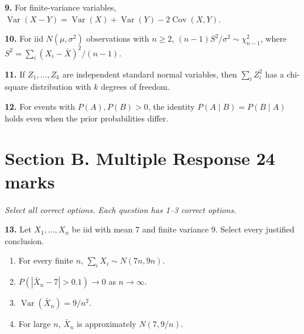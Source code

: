 \documentclass[11pt,a4paper]{article}
\begin{document}
\par\noindent\begin{minipage}{\linewidth}
\textbf{9.} For finite-variance variables, \(\operatorname{Var}(X-Y)=\operatorname{Var}(X)+\operatorname{Var}(Y)-2\operatorname{Cov}(X,Y)\).
\end{minipage}\par\vspace{3mm}
\par\noindent\begin{minipage}{\linewidth}
\textbf{10.} For iid \(N(\mu,\sigma^2)\) observations with \(n\ge2\), \((n-1)S^2/\sigma^2\sim\chi^2_{n-1}\), where \(S^2=\sum_i(X_i-\bar X)^2/(n-1)\).
\end{minipage}\par\vspace{3mm}
\par\noindent\begin{minipage}{\linewidth}
\textbf{11.} If \(Z_1,\ldots,Z_k\) are independent standard normal variables, then \(\sum_i Z_i^2\) has a chi-square distribution with \(k\) degrees of freedom.
\end{minipage}\par\vspace{3mm}
\par\noindent\begin{minipage}{\linewidth}
\textbf{12.} For events with \(P(A),P(B)>0\), the identity \(P(A\mid B)=P(B\mid A)\) holds even when the prior probabilities differ.
\end{minipage}\par\vspace{3mm}
\newpage\section*{Section B. Multiple Response \hfill 24 marks}
\textit{Select all correct options. Each question has 1--3 correct options.}\par
\par\noindent\begin{minipage}{\linewidth}
\textbf{13.} Let \(X_1,\ldots,X_n\) be iid with mean \(7\) and finite variance \(9\). Select every justified conclusion.
\begin{enumerate}[label=(\Alph*),leftmargin=8mm,itemsep=2pt,topsep=2pt]
\item For every finite \(n\), \(\sum_iX_i\sim N(7n,9n)\).
\item \(P(|\bar X_n-7|>0.1)\to0\) as \(n\to\infty\).
\item \(\operatorname{Var}(\bar X_n)=9/n^2\).
\item For large \(n\), \(\bar X_n\) is approximately \(N(7,9/n)\).
\end{enumerate}

\end{minipage}\par\vspace{3mm}
\end{document}
